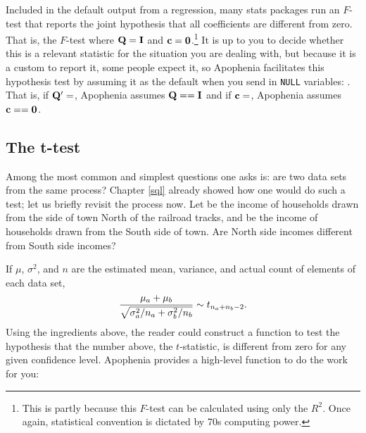 Included in the default output from a regression,
many stats packages run an $F$-test that reports the
joint hypothesis that all coefficients are different from zero. That is,
the $F$-test where ${\bf Q} = {\bf I}$ and ${\bf c} = {\bf 0}$.\footnote{This is
partly because this $F$-test can be calculated using only the $R^2$.
Once again, statistical convention is dictated by 70s computing power.}
It is up to you
to decide whether this is a relevant statistic for the situation you are
dealing with, but because it is a custom to report it, some
people expect it, so Apophenia facilitates this hypothesis test by
assuming it as the default when you send in {\tt NULL} variables:
. That is,
if ${\bf Q}'=$, Apophenia assumes ${\bf Q}=={\bf I}$ and if
${\bf c}=$, Apophenia assumes ${\bf c} == {\bf 0}$.





\subsection{The t-test} \label{ttest}
Among the most common and simplest questions one asks is: are two data
sets from the same process? Chapter \ref{sql} already showed how one
would do such a test; let us briefly revisit the process now.
Let  be the income of households
drawn from the side of town North of the railroad tracks, and
 be the income of households drawn from the South side of
town. Are North side incomes different from South side incomes? 

If $\mu$,
$\sigma^2$, and $n$ are the estimated mean, variance, and actual count
of elements of each data set,
$${\mu_a + \mu_b \over \sqrt{\sigma^2_a/n_a + \sigma^2_b/n_b}} \sim t_{n_a + n_b -2}.$$
Using the ingredients above, the reader could construct a function to
test the hypothesis that the number above, the $t$-statistic, is
different from zero for any given confidence level. Apophenia provides a
high-level function to do the work for you:

